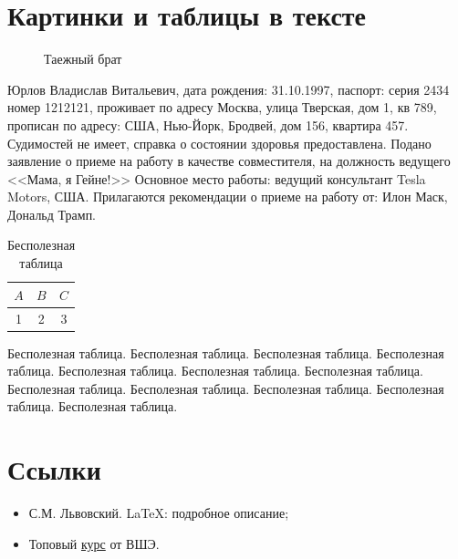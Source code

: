 \documentclass[a4paper,12pt]{article} %
\begin{document}
\section{Картинки и таблицы в тексте}
\begin{figure}

\caption{Таежный брат}
\end{figure} Юрлов Владислав Витальевич, дата рождения: 31.10.1997, паспорт: серия 2434 номер 1212121, проживает по адресу Москва, улица Тверская, дом 1, кв 789, прописан по адресу: США, Нью-Йорк, Бродвей, дом 156, квартира 457. Судимостей не имеет, справка о состоянии здоровья предоставлена. Подано заявление о приеме на работу в качестве совместителя, на должность ведущего <<Мама, я Гейне!>> Основное место работы: ведущий консультант Tesla Motors, США. Прилагаются рекомендации о приеме на работу от: Илон Маск, Дональд Трамп. 

\begin{table}
\begin{tabular}{|c|c|c|}
\hline 
$A$ & $B$ & $C$ \\ 
\hline 
1 & 2 & 3 \\ 
\hline 
\end{tabular} 
\caption{Бесполезная таблица}
\end{table} Бесполезная таблица. Бесполезная таблица. Бесполезная таблица. Бесполезная таблица. Бесполезная таблица. Бесполезная таблица. Бесполезная таблица. Бесполезная таблица. Бесполезная таблица. Бесполезная таблица. Бесполезная таблица. Бесполезная таблица. 

\listoffigures
\listoftables

\section{Ссылки}

\begin{itemize}
\item С.М. Львовский. \LaTeX : подробное описание;
\item Топовый \href{https://www.coursera.org/learn/latex}{курс} от ВШЭ.
\end{itemize}
\end{document}
